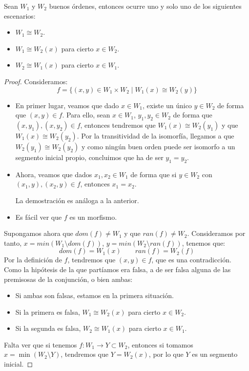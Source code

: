 \begin{teo}
    Sean $W_1$ y $W_2$ buenos órdenes, entonces ocurre uno y solo uno de los siguientes escenarios:
    \begin{itemize}
        \item $W_1\cong W_2$.
        \item $W_1 \cong W_2(x)$ para cierto $x\in W_2$.
        \item $W_2 \cong W_1(x)$ para cierto $x\in W_1$.
    \end{itemize}
    \begin{proof}
        Consideramos:
        \begin{equation*}
            f = \{(x,y)\in W_1\times W_2 \mid W_1(x) \cong W_2(y)\}
        \end{equation*}
        \begin{itemize}
            \item En primer lugar, veamos que dado $x\in W_1$, existe un único $y\in W_2$ de forma que $(x,y)\in f$. Para ello, sean $x\in W_1$, $y_1,y_2\in W_2$ de forma que $(x,y_1),(x,y_2)\in f$, entonces tendremos que $W_1(x)\cong W_2(y_1)$ y que ${W_1(x)\cong W_2(y_2)}$. Por la transitividad de la isomorfía, llegamos a que $W_2(y_1)\cong W_2(y_2)$ y como ningún buen orden puede ser isomorfo a un segmento inicial propio, concluimos que ha de ser $y_1 = y_2$.
            \item Ahora, veamos que dados $x_1,x_2\in W_1$ de forma que si $y\in W_2$ con $(x_1,y),(x_2,y)\in f$, entonces $x_1 = x_2$.

                La demostración es análoga a la anterior.
            \item Es fácil ver que $f$ es un morfismo.
        \end{itemize}
        Supongamos ahora que $dom(f) \neq W_1$ y que $ran(f)\neq W_2$. Consideramos por tanto, $x=min(W_1\setminus dom(f))$, $y=min(W_2\setminus ran(f))$, tenemos que: 
        \begin{equation*}
            dom(f) = W_1(x) \qquad ran(f) = W_2(f)
        \end{equation*}
        Por la definición de $f$, tendremos que $(x,y)\in f$, que es una contradicción.\\

        \noindent
        Como la hipótesis de la que partíamos era falsa, a de ser falsa alguna de las premisosas de la conjunción, o bien ambas:
        \begin{itemize}
            \item Si ambas son falsas, estamos en la primera situación.
            \item Si la primera es falsa, $W_1\cong W_2(x)$ para cierto $x\in W_2$.
            \item Si la segunda es falsa, $W_2\cong W_1(x)$ para cierto $x\in W_1$.
        \end{itemize}
        Falta ver que si tenemos $f:W_1\to Y\subset W_2$, entonces si tomamos $x= \min(W_2\setminus Y)$, tendremos que $Y = W_2(x)$, por lo que $Y$ es un segmento inicial.
    \end{proof}
\end{teo}

